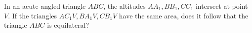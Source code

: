 In an acute-angled triangle $ABC$, the altitudes $AA_1,BB_1,CC_1$ intersect at point $V$. If the triangles $AC_1V, BA_1V, CB_1V$ have the same area, does it follow that the triangle $ABC$ is equilateral?